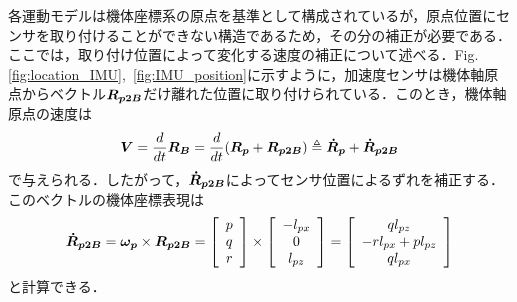 各運動モデルは機体座標系の原点を基準として構成されているが，原点位置にセンサを取り付けることができない構造であるため，その分の補正が必要である．ここでは，取り付け位置によって変化する速度の補正について述べる．Fig. \ref{fig:location_IMU},~\ref{fig:IMU_position}に示すように，加速度センサは機体軸原点からベクトル$\mbox{\boldmath $R_{p2B}$}$だけ離れた位置に取り付けられている．このとき，機体軸原点の速度は
\begin{equation}
  \mbox{\boldmath $V$} = \dfrac{d}{dt}\mbox{\boldmath $R_B$} = \dfrac{d}{dt}(\mbox{\boldmath $R_p$}+\mbox{\boldmath $R_{p2B}$})\triangleq \mbox{\boldmath $\dot{R}_p$}+\mbox{\boldmath $\dot{R}_{p2B}$}
\end{equation}
で与えられる．したがって，$\mbox{\boldmath $\dot{R}_{p2B}$}$によってセンサ位置によるずれを補正する．このベクトルの機体座標表現は
\begin{equation}
  \mbox{\boldmath $\dot{R}_{p2B}$} = \mbox{\boldmath $\omega_p$}\times\mbox{\boldmath $R_{p2B}$} =
  \left[
    \begin{array}{ccc}
      p \\
      q \\
      r
    \end{array}
  \right] \times
  \left[
    \begin{array}{ccc}
      -l_{px} \\
      0 \\
      l_{pz}
    \end{array}
  \right] =
  \left[
    \begin{array}{ccc}
      ql_{pz} \\
      -rl_{px} + pl_{pz} \\
      ql_{px}
    \end{array}
  \right]
\end{equation}
と計算できる．

